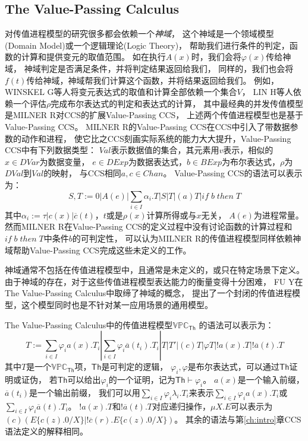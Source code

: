 \subsection{The Value-Passing Calculus}\label{ch:vpc}
对传值进程模型的研究很多都会依赖一个\textit{神域}，
这个神域是一个领域模型(Domain Model)或一个逻辑理论(Logic Theory)，
帮助我们进行条件的判定，函数的计算和提供变元的取值范围。
如在执行$A(x)$时，我们会将$\varphi(x)$传给神域，
神域判定是否满足条件，并将判定结果返回给我们，
同样的，我们也会将$f(t)$传给神域，神域帮我们计算这个函数，并将结果返回给我们。
例如，WINSKEL G等人将变元表达式的取值和计算全部依赖一个集合$V$\cite{Oracle_V}，
LIN H等人依赖一个评估$\rho$完成布尔表达式的判定和表达式的计算\cite{Oracle_rho}，
其中最经典的并发传值模型是MILNER R对CCS的扩展Value-Passing CCS\cite{Milner_CCS}，
上述两个传值进程模型也是基于Value-Passing CCS。 
MILNER R的Value-Passing CCS在CCS中引入了带数据参数的动作和进程，
使它比之CCS刻画实际系统的能力大大提升，Value-Passing CCS中有下列数据类型：
$Val$表示数据值的集合，其元素用$v$表示，相似的$x\in DVar$为数据变量，
$e\in DExp$为数据表达式，$b\in BExp$为布尔表达式，$\rho$为$DVal$到$Val$的映射，
与CCS相同$a,c\in Chan$。
Value-Passing CCS的语法可以表示为：
\begin{equation}
   S,T:=0|A(e)|\sum_{i\in I}\alpha_i.T|S|T|(a)T|if\;b\;then\;T
\end{equation}
其中$\alpha_i:=\tau|c(x)|\overline{c}(t)$，$t$或是$\rho(x)$计算所得或与$x$无关，
$A(e)$为进程常量\cite{VPCCS}。
然而MILNER R在Value-Passing CCS的定义过程中没有讨论函数的计算过程和$if\;b\;then\;T$中条件$b$的可判定性，
可以认为MILNER R的传值进程模型同样依赖神域帮助Value-Passing CCS完成这些未定义的工作。

神域通常不包括在传值进程模型中，且通常是未定义的，或只在特定场景下定义。
由于神域的存在，对于这些传值进程模型表达能力的衡量变得十分困难，
FU Y在The Value-Passing Calculus中取缔了神域的概念，
提出了一个封闭的传值进程模型\cite{Fu_VPC}，这个模型同时也是不针对某一应用场景的通用模型。

The Value-Passing Calculus中的传值进程模型$\mathbb{VPC}_{\mathsf{Th}}$
的语法可以表示为：
\begin{equation}\label{eq:vpc}
   T:=\sum_{i\in I}\varphi_i a(x).T_i|\sum_{i\in I}\varphi_i\overline{a}(t_i).T_i|T|T'|(c)T|\varphi T|!a(x).T|!\overline{a}(t).T
\end{equation}
其中$T$是一个$\mathbb{VPC}_{\mathsf{Th}}$项，$\mathsf{Th}$是可判定的逻辑，
$\varphi_i,\varphi$是布尔表达式，可以通过$\mathsf{Th}$证明或证伪，
若$\mathsf{Th}$可以给出$\varphi_i$的一个证明，记为$\mathsf{Th}\vdash \varphi_i$。
$a(x)$是一个输入前缀，$\overline{a}(t_i)$是一个输出前缀，
我们可以用$\sum_{i\in I}\varphi_i\lambda_i.T_i$来表示$\sum_{i\in I}\varphi_i a(x).T_i$或$\sum_{i\in I}\varphi_i \overline{a}(t).T_i$。
$!a(x).T$和$!\overline{a}(t).T$对应递归操作，$\mu X.E$可以表示为
$(c)(E\{c(z).0/X\}|!\overline{c}(r).E\{c(z).0/X\})$。
其余的语法与第\ref{ch:intro}章CCS语法定义的解释相同。

